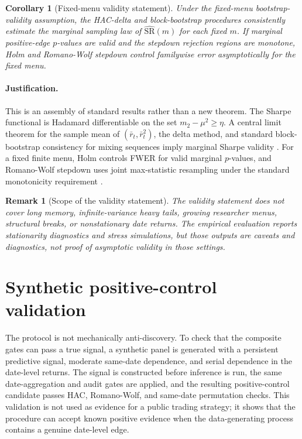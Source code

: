 \documentclass[12pt,a4paper]{article}
\newtheorem{corollary}{Corollary}
\newtheorem{remark}{Remark}
\newcommand{\SR}{\mathrm{SR}}
\begin{document}
\begin{corollary}[Fixed-menu validity statement]
Under the fixed-menu bootstrap-validity assumption, the HAC-delta and
block-bootstrap procedures consistently estimate the marginal sampling
law of \(\widehat{\SR}(m)\) for each fixed \(m\).  If marginal
positive-edge \(p\)-values are valid and the stepdown rejection regions
are monotone, Holm and Romano-Wolf stepdown control familywise error
asymptotically for the fixed menu.
\end{corollary}

\paragraph{Justification.}
This is an assembly of standard results rather than a new theorem.  The
Sharpe functional is Hadamard differentiable on the set
\(m_2-\mu^2\ge\eta\).  A central limit theorem for the sample mean of
\((\bar r_t,\bar r_t^2)\), the delta method, and standard block-bootstrap
consistency for mixing sequences imply marginal Sharpe validity
\citep{kunsch1989jackknife,politis1994stationary,lahiri2003resampling}.
For a fixed finite menu, Holm controls FWER for valid marginal
\(p\)-values, and Romano-Wolf stepdown uses joint max-statistic
resampling under the standard monotonicity requirement
\citep{holm1979simple,romano2005stepwise}.

\begin{remark}[Scope of the validity statement]
The validity statement does not cover long memory, infinite-variance
heavy tails, growing researcher menus, structural breaks, or
nonstationary date returns.  The empirical evaluation reports stationarity
diagnostics and stress simulations, but those outputs are caveats and
diagnostics, not proof of asymptotic validity in those settings.
\end{remark}

\section{Synthetic positive-control validation}
\label{sec:positive-control}

The protocol is not mechanically anti-discovery.  To check that the
composite gates can pass a true signal, a synthetic panel is generated
with a persistent predictive signal, moderate same-date dependence, and
serial dependence in the date-level returns.  The signal is constructed
before inference is run, the same date-aggregation and audit gates are
applied, and the resulting positive-control candidate passes HAC,
Romano-Wolf, and same-date permutation checks.  This validation is not
used as evidence for a public trading strategy; it shows that the
procedure can accept known positive evidence when the data-generating
process contains a genuine date-level edge.
\end{document}
